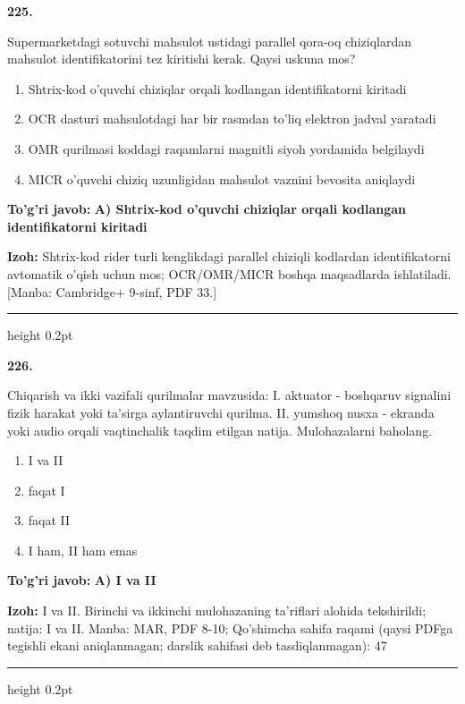 \documentclass[10pt,a4paper]{article}
\begin{document}
{\bfseries\sffamily\color{ink} 225.}
\par
Supermarketdagi sotuvchi mahsulot ustidagi parallel qora-oq chiziqlardan mahsulot identifikatorini tez kiritishi kerak. Qaysi uskuna mos?
\begin{enumerate}[label=\Alph*),leftmargin=9mm]
\item Shtrix-kod o'quvchi chiziqlar orqali kodlangan identifikatorni kiritadi
\item OCR dasturi mahsulotdagi har bir rasmdan to'liq elektron jadval yaratadi
\item OMR qurilmasi koddagi raqamlarni magnitli siyoh yordamida belgilaydi
\item MICR o'quvchi chiziq uzunligidan mahsulot vaznini bevosita aniqlaydi
\end{enumerate}
\begin{tcolorbox}[enhanced,breakable,colback=teal!4,colframe=teal!60!black,boxrule=0.45pt,arc=1.2mm,left=2.7mm,right=2.7mm,top=1.8mm,bottom=1.8mm,before skip=2mm,after skip=2mm]
{\bfseries\sffamily\color{teal}To'g'ri javob:} \textbf{A) Shtrix-kod o'quvchi chiziqlar orqali kodlangan identifikatorni kiritadi}
\par\smallskip
{\bfseries Izoh:} Shtrix-kod rider turli kenglikdagi parallel chiziqli kodlardan identifikatorni avtomatik o'qish uchun mos; OCR/OMR/MICR boshqa maqsadlarda ishlatiladi. [Manba: Cambridge+ 9-sinf, PDF 33.]
\end{tcolorbox}
\vspace{2mm}\hrule height 0.2pt\vspace{3mm}

{\bfseries\sffamily\color{ink} 226.}
\par
Chiqarish va ikki vazifali qurilmalar mavzusida: I. aktuator - boshqaruv signalini fizik harakat yoki ta'sirga aylantiruvchi qurilma. II. yumshoq nusxa - ekranda yoki audio orqali vaqtinchalik taqdim etilgan natija. Mulohazalarni baholang.
\begin{enumerate}[label=\Alph*),leftmargin=9mm]
\item I va II
\item faqat I
\item faqat II
\item I ham, II ham emas
\end{enumerate}
\begin{tcolorbox}[enhanced,breakable,colback=teal!4,colframe=teal!60!black,boxrule=0.45pt,arc=1.2mm,left=2.7mm,right=2.7mm,top=1.8mm,bottom=1.8mm,before skip=2mm,after skip=2mm]
{\bfseries\sffamily\color{teal}To'g'ri javob:} \textbf{A) I va II}
\par\smallskip
{\bfseries Izoh:} I va II. Birinchi va ikkinchi mulohazaning ta'riflari alohida tekshirildi; natija: I va II. Manba: MAR, PDF 8-10; Qo'shimcha sahifa raqami (qaysi PDFga tegishli ekani aniqlanmagan; darslik sahifasi deb tasdiqlanmagan): 47
\end{tcolorbox}
\vspace{2mm}\hrule height 0.2pt\vspace{3mm}
\end{document}
